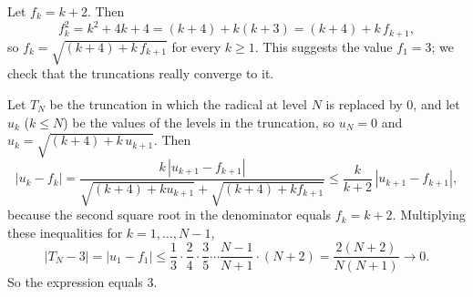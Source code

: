 Let $f_k=k+2$. Then
\[
f_k^2=k^2+4k+4=(k+4)+k(k+3)=(k+4)+k\,f_{k+1},
\]
so $f_k=\sqrt{(k+4)+k\,f_{k+1}}$ for every $k\ge1$. This suggests the value $f_1=\boxed{3}$; we check that the truncations really converge to it.

Let $T_N$ be the truncation in which the radical at level $N$ is replaced by $0$, and let $u_k$ ($k\le N$) be the values of the levels in the truncation, so $u_N=0$ and $u_k=\sqrt{(k+4)+k\,u_{k+1}}$. Then
\[
|u_k-f_k|=\dfrac{k\,|u_{k+1}-f_{k+1}|}{\sqrt{(k+4)+k u_{k+1}}+\sqrt{(k+4)+k f_{k+1}}}\le\dfrac{k}{k+2}\,|u_{k+1}-f_{k+1}|,
\]
because the second square root in the denominator equals $f_k=k+2$. Multiplying these inequalities for $k=1,\dots,N-1$,
\[
|T_N-3|=|u_1-f_1|\le\dfrac{1}{3}\cdot\dfrac{2}{4}\cdot\dfrac{3}{5}\cdots\dfrac{N-1}{N+1}\cdot(N+2)=\dfrac{2(N+2)}{N(N+1)}\to0 .
\]
So the expression equals $3$.
